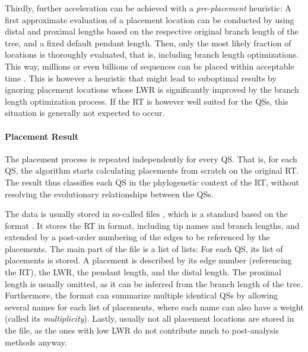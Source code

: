 Thirdly, further acceleration can be achieved with a \emph{pre-placement} heuristic:
A first approximate evaluation of a placement location can be conducted by using
distal and proximal lengths based on the respective original branch length of the tree, and a fixed default pendant length.
Then, only the most likely fraction of locations is thoroughly evaluated, that is, including branch length optimizations.
This way, millions or even billions of sequences can be placed within acceptable time \cite{Barbera2018}.
This is however a heuristic that might lead to suboptimal results by ignoring placement locations
whose \ac{LWR} is significantly improved by the branch length optimization process.
If the \ac{RT} is however well suited for the \acp{QS}, this situation is generally not expected to occur.

\paragraph{Placement Result}
\label{ch:Foundations:sec:PhylogeneticPlacement:sub:PipelineAndComputation:par:PlacementResults}

The placement process is repeated independently for every \ac{QS}.
That is, for each \ac{QS}, the algorithm starts calculating placements from scratch on the original \ac{RT}.
The result thus classifies each \ac{QS} in the phylogenetic context of the \ac{RT},
without resolving the evolutionary relationships between the \acp{QS}.

The data is usually stored in so-called  files \cite{Matsen2012},
which is a standard based on the  format \cite{JsonMemo,JsonStandard}.
It stores the \ac{RT} in  format, including tip names and branch lengths,
and extended by a post-order numbering of the edges to be referenced by the placements.
The main part of the file is a list of lists:
For each \ac{QS}, its list of placements is stored.
A placement is described by its edge number (referencing the \ac{RT}),
the \ac{LWR}, the pendant length, and the distal length.
The proximal length is usually omitted, as it can be inferred from the branch length of the tree.
Furthermore, the format can summarize multiple identical \acp{QS}
by allowing several names for each list of placements,
where each name can also have a weight (called its \emph{multiplicity}).
Lastly, usually not all placement locations are stored in the file,
as the ones with low \ac{LWR} do not contribute much to post-analysis methods anyway.


